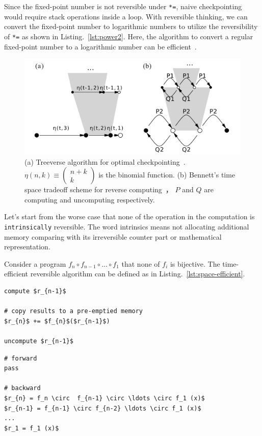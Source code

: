 \documentclass{article}
\newcommand{\<}{\langle}
\renewcommand{\>}{\rangle}
\newcommand{\Lst}[1]{Listing.~\ref{#1}}
\theoremstyle{definition}\newtheorem{definition}{\textit{Definition}}
\begin{document}
Since the fixed-point number is not reversible under \texttt{*=}, naive checkpointing would require stack operations inside a loop. With reversible thinking, we can convert the fixed-point number to logarithmic numbers to utilize the reversibility of \texttt{*=} as shown in \Lst{lst:power2}. Here, the algorithm to convert a regular fixed-point number to a logarithmic number can be efficient~\cite{Turner2010}.


\begin{figure}
    \centerline{\includegraphics[width=0.88\columnwidth,trim={0 0cm 0 0cm},clip]{tradeoff.pdf}}
    \caption{(a) Treeverse algorithm for optimal checkpointing~\cite{Griewank1992}. $\eta(n, k) \equiv \left(\begin{matrix} n + k \\ k \end{matrix}\right)$ is the binomial function. (b) Bennett's time space tradeoff scheme for reverse computing~\cite{Bennett1973,Levine1990}， $P$ and $Q$ are computing and uncomputing respectively.}\label{fig:tradeoff}
\end{figure}

Let's start from the worse case that none of the operation in the computation is \texttt{intrinsically} reversible.
The word intrinsics means not allocating additional memory comparing with its irreversible counter part or mathematical representation.

Consider a program $f_n \circ f_{n-1} \circ ... \circ f_1$ that none of $f_i$ is bijective. The time-efficient reversible algorithm can be defined as in \Lst{lst:space-efficient}.

\begin{minipage}{.45\columnwidth}
\begin{lstlisting}[mathescape=true,caption={Reverse computing space efficiently},label={lst:space-efficient}]
compute $r_{n-1}$

# copy results to a pre-emptied memory
$r_{n}$ += $f_{n}$($r_{n-1}$)

uncompute $r_{n-1}$
\end{lstlisting}
\end{minipage}
\begin{minipage}{.45\columnwidth}
\begin{lstlisting}[mathescape=true,caption={Checkpointing space efficiently},label={lst:checkpointing-space-efficient}]
# forward
pass

# backward
$r_{n} = f_n \circ  f_{n-1} \circ \ldots \circ f_1 (x)$
$r_{n-1} = f_{n-1} \circ f_{n-2} \ldots \circ f_1 (x)$
...
$r_1 = f_1 (x)$
\end{lstlisting}
\end{minipage}
\end{document}
